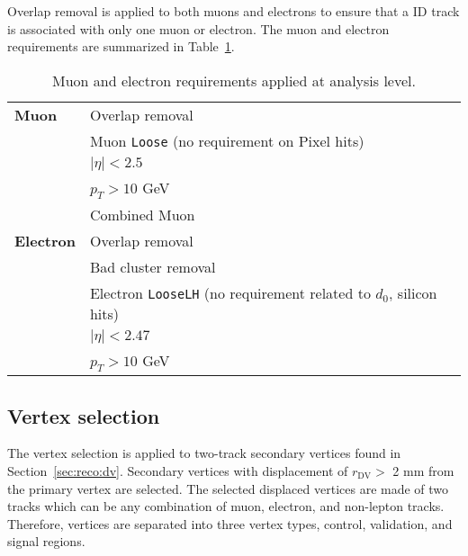 Overlap removal is applied to both muons and electrons to ensure that a ID track is associated with only one muon or electron. The muon and electron requirements are summarized in Table~\ref{table:lepton_requirement}.

\begin{table}[!htb]
  \centering
  \begin{tabular}{ l  l }
    \hline
    \hline
    \textbf{Muon}     &       Overlap removal                                                                      \\
                                  &       Muon \texttt{Loose} (no requirement on Pixel hits)                       \\
                                  &       $|\eta| < 2.5$                                                           \\
                                  &       $p_{T} > 10$ GeV                                                         \\
                                  &       Combined Muon                                                            \\
    \hline
    \textbf{Electron} &       Overlap removal                                                                      \\
                                  &       Bad cluster removal                                                      \\
                                  &       Electron \texttt{LooseLH} (no requirement related to $d_{0}$, silicon hits)\\
                                  &       $|\eta| < 2.47$                                                          \\
                                  &       $p_{T} > 10$ GeV                                                         \\
    \hline
    \hline
  \end{tabular}
  \caption{Muon and electron requirements applied at analysis level.}
  \label{table:lepton_requirement}
\end{table}







\subsection{Vertex selection}
\label{sec:vertex_selection}
The vertex selection is applied to two-track secondary vertices found in Section~\ref{sec:reco:dv}. Secondary vertices with displacement of $r_{\mathrm{DV}}>$ 2 mm from the primary vertex are selected. The selected displaced vertices are made of two tracks which can be any combination of muon, electron, and non-lepton tracks. Therefore, vertices are separated into three vertex types, control, validation, and signal regions.

